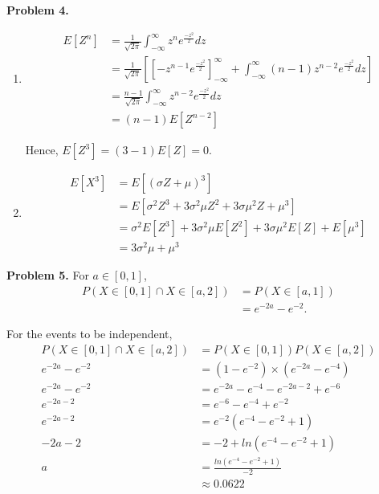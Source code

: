 \documentclass{article}
\begin{document}
\textbf{Problem 4.}
\begin{enumerate}[label={(\alph*)}]
    \item 
    \begin{align}
        E[Z^n] & = \frac{1}{\sqrt{2\pi}}\int_{-\infty}^{\infty}z^ne^{\frac{-z^2}{2}}dz \\
        & = \frac{1}{\sqrt{2\pi}}\left[\left[-z^{n-1}e^{\frac{-z^2}{2}}\right]_{-\infty}^{\infty}+\int_{-\infty}^{\infty}(n-1)z^{n-2}e^{\frac{-z^2}{2}}dz\right] \\
        & = \frac{n-1}{\sqrt{2\pi}}\int_{-\infty}^{\infty}z^{n-2}e^{\frac{-z^2}{2}}dz \\
        & = (n-1)E[Z^{n-2}]
    \end{align}
    
    Hence, $E[Z^3]=(3-1)E[Z]=0.$

    \item 
    \begin{align}
        E[X^3] & = E[\left(\sigma Z+\mu\right)^3] \\
        & = E[\sigma^2Z^3+3\sigma^2\mu Z^2+3\sigma\mu^2Z+\mu^3] \\
        & = \sigma^2E[Z^3]+3\sigma^2\mu E[Z^2]+3\sigma\mu^2E[Z]+E[\mu^3] \\
        & =3\sigma^2\mu+\mu^3
    \end{align}
\end{enumerate}
\bigbreak

\textbf{Problem 5.}
For $a \in [0,1]$,
\begin{align}
    P(X \in [0,1] \cap X \in [a,2]) & = P(X\in[a,1]) \\
    & = e^{-2a}-e^{-2}.
\end{align}

For the events to be independent,
\begin{align}
    P(X \in [0,1] \cap X \in [a,2]) & =P(X\in [0,1])P(X\in [a,2]) \\
    e^{-2a}-e^{-2} & = \left(1-e^{-2}\right)\times \left(e^{-2a}-e^{-4}\right) \\
    e^{-2a}-e^{-2} & = e^{-2a}-e^{-4}-e^{-2a-2}+e^{-6} \\
    e^{-2a-2} & =e^{-6}-e^{-4}+e^{-2} \\
    e^{-2a-2} & =e^{-2}\left(e^{-4}-e^{-2}+1\right) \\
    -2a-2 & = -2 + ln(e^{-4}-e^{-2}+1) \\
    a & = \frac{ln(e^{-4}-e^{-2}+1)}{-2} \\
    & \approx 0.0622
\end{align}
\bigbreak
\end{document}
